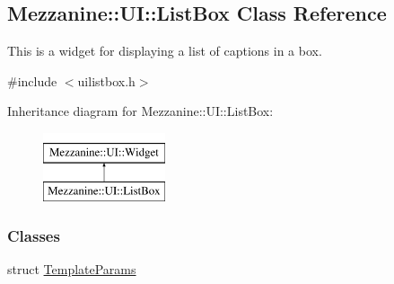 \hypertarget{classMezzanine_1_1UI_1_1ListBox}{
\subsection{Mezzanine::UI::ListBox Class Reference}
\label{classMezzanine_1_1UI_1_1ListBox}
}


This is a widget for displaying a list of captions in a box.  




{\ttfamily \#include $<$uilistbox.h$>$}

Inheritance diagram for Mezzanine::UI::ListBox:\begin{figure}[H]
\begin{center}
\leavevmode
\includegraphics[height=2.000000cm]{classMezzanine_1_1UI_1_1ListBox}
\end{center}
\end{figure}
\subsubsection*{Classes}
\begin{DoxyCompactItemize}
\item 
struct \hyperlink{structMezzanine_1_1UI_1_1ListBox_1_1TemplateParams}{TemplateParams}
\end{DoxyCompactItemize}
